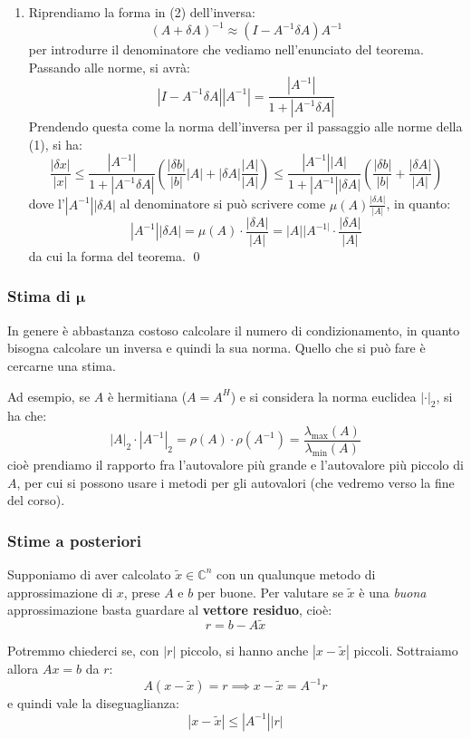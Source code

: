 \documentclass[a4paper,11pt]{article}
\begin{document}
\begin{enumerate}
\item 
Riprendiamo la forma in (2) dell'inversa:
$$
(A + \delta A)^{-1} \approx (I - A^{-1} \delta A ) A^{-1} 
$$
per introdurre il denominatore che vediamo nell'enunciato del teorema.
Passando alle norme, si avrà:
$$
|I - A^{-1} \delta A| |A^{-1}| = \frac{|A^{-1}|}{1 + |A^{-1} \delta A|}
$$
Prendendo questa come la norma dell'inversa per il passaggio alle norme della (1), si ha:
$$
\frac{|\delta x|}{|x|} \leq \frac{|A^{-1}|}{1 + |A^{-1} \delta A|} \left( \frac{|\delta b|}{|b|} |A| + |\delta A| \frac{|A|}{|A|} \right) \leq \frac{ |A^{-1}| |A| }{ 1 + |A^{-1}| |\delta A| } \left( \frac{|\delta b|}{|b|} + \frac{|\delta A|}{|A|} \right)
$$
dove l'$|A^{-1}| |\delta A|$ al denominatore si può scrivere come $\mu(A) \frac{|\delta A|}{|A|}$, in quanto:
$$
|A^{-1}| |\delta A| = \mu(A) \cdot \frac{|\delta A|}{|A|} = |A||A^{-1|} \cdot \frac{|\delta A|}{|A|}
$$
da cui la forma del teorema. \qed
\end{enumerate}

\subsubsection{Stima di $\mathbf{\mu}$}
In genere è abbastanza costoso calcolare il numero di condizionamento, in quanto bisogna calcolare un inversa e quindi la sua norma.
Quello che si può fare è cercarne una stima.

Ad esempio, se $A$ è hermitiana ($A = A^H$) e si considera la norma euclidea $|\cdot|_2$, si ha che:
$$
|A|_2 \cdot |A^{-1}|_2 = \rho(A) \cdot \rho(A^{-1}) = \frac{\lambda_\text{max}(A)}{\lambda_\text{min}(A)}
$$
cioè prendiamo il rapporto fra l'autovalore più grande e l'autovalore più piccolo di $A$, per cui si possono usare i metodi per gli autovalori (che vedremo verso la fine del corso).

\subsubsection{Stime a posteriori}
Supponiamo di aver calcolato $\tilde{x} \in \mathbb{C}^n$ con un qualunque metodo di approssimazione di $x$, prese $A$ e $b$ per buone.
Per valutare se $\tilde{x}$ è una \textit{buona} approssimazione basta guardare al \textbf{vettore residuo}, cioè:
$$
r = b - A \tilde{x}
$$

Potremmo chiederci se, con $|r|$ piccolo, si hanno anche $|x - \tilde{x}|$ piccoli.
Sottraiamo allora $Ax = b$ da $r$:
$$
A \left( x - \tilde{x} \right) = r \implies x - \tilde{x} = A^{-1} r
$$
e quindi vale la diseguaglianza:
$$
|x - \tilde{x} | \leq |A^{-1}| |r|
$$
\end{document}
